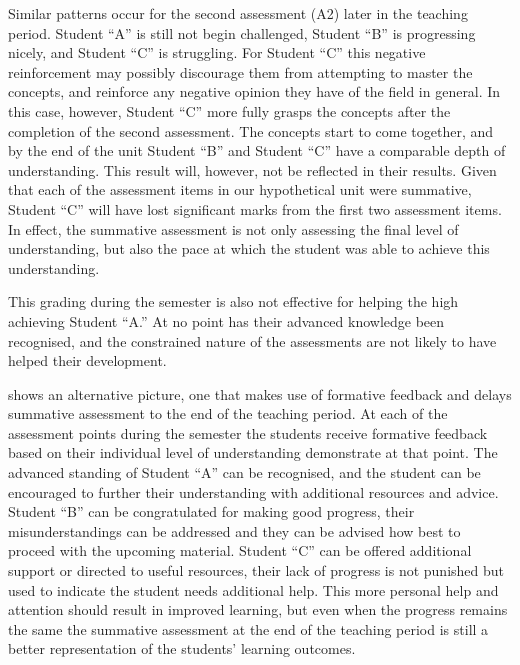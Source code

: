 Similar patterns occur for the second assessment (A2) later in the teaching period. Student ``A'' is still not begin challenged, Student ``B'' is progressing nicely, and Student ``C'' is struggling. For Student ``C'' this negative reinforcement may possibly discourage them from attempting to master the concepts, and reinforce any negative opinion they have of the field in general. In this case, however, Student ``C'' more fully grasps the concepts after the completion of the second assessment. The concepts start to come together, and by the end of the unit Student ``B'' and Student ``C'' have a comparable depth of understanding. This result will, however, not be reflected in their results. Given that each of the assessment items in our hypothetical unit were summative, Student ``C'' will have lost significant marks from the first two assessment items. In effect, the summative assessment is not only assessing the final level of understanding, but also the pace at which the student was able to achieve this understanding. 

This grading during the semester is also not effective for helping the high achieving Student ``A.'' At no point has their advanced knowledge been recognised, and the constrained nature of the assessments are not likely to have helped their development. 

 shows an alternative picture, one that makes use of formative feedback and delays summative assessment to the end of the teaching period. At each of the assessment points during the semester the students receive formative feedback based on their individual level of understanding demonstrate at that point. The advanced standing of Student ``A'' can be recognised, and the student can be encouraged to further their understanding with additional resources and advice. Student ``B'' can be congratulated for making good progress, their misunderstandings can be addressed and they can be advised how best to proceed with the upcoming material. Student ``C'' can be offered additional support or directed to useful resources, their lack of progress is not punished but used to indicate the student needs additional help. This more personal help and attention should result in improved learning, but even when the progress remains the same the summative assessment at the end of the teaching period is still a better representation of the students' learning outcomes.

